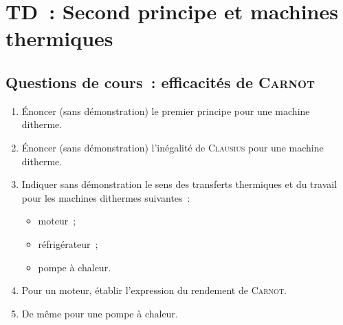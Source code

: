 \documentclass[a4paper, 10pt, final, garamond]{book}
\begin{document}
\setcounter{chapter}{2}

\chapter{TD~: Second principe et machines thermiques}

\section{Questions de cours~: efficacités de \textsc{Carnot}}
\begin{enumerate}
  \item Énoncer (sans démonstration) le premier principe pour une machine
    ditherme.
  \item Énoncer (sans démonstration) l'inégalité de \textsc{Clausius} pour une
    machine ditherme.
  \item Indiquer sans démonstration le sens des transferts thermiques et du
    travail pour les machines dithermes suivantes~:
    \begin{itemize}
      \item moteur~;
      \item réfrigérateur~;
      \item pompe à chaleur.
    \end{itemize}
  \item Pour un moteur, établir l'expression du rendement de \textsc{Carnot}.
  \item De même pour une pompe à chaleur.
\end{enumerate}
\end{document}
